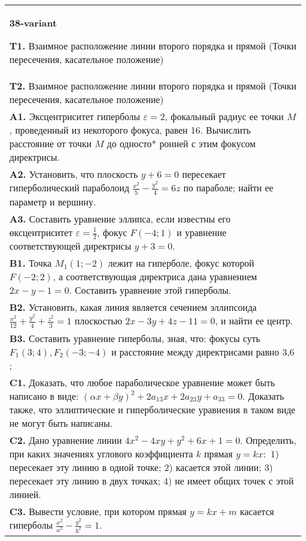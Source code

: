 \documentclass{article}
\begin{document}
\begin{tabular}{m{17cm}}
\textbf{38-variant}
\newline

\textbf{T1.} Взаимное расположение линии второго порядка и прямой (Точки пересечения, касательное положение) \\
\textbf{T2.} Взаимное расположение линии второго порядка и прямой (Точки пересечения, касательное положение) \\
\textbf{A1.} Эксцентриситет гиперболы $\varepsilon=2$, фокальный радиус ее точки $M$, проведенный из некоторого фокуса, равен 16. Вычислить расстояние от точки $M$ до односто* ронней с этим фокусом директрисы. \\
\textbf{A2.} Установить, что плоскость $y+6=0$ пересекает гиперболический параболоид $\frac{x^2}{5}-\frac{y^2}{4}=6 z$ по параболе; найти ее параметр и вершину. \\
\textbf{A3.} Составить уравнение эллипса, если известны его өксцентриситет $\varepsilon=\frac{1}{2}$, фокус $F(-4 ; 1)$ и уравнение соответствующей директрисы $y+3=0$. \\
\textbf{B1.} Точка $M_1(1 ;-2)$ лежит на гиперболе, фокус которой $F(-2 ; 2)$, а соответствующая директриса дана уравнением $2 x-y-1=0$. Составить уравнение этой гиперболы. \\
\textbf{B2.} Установить, какая линия является сечением эллипсоида $\frac{x^2}{12}+\frac{y^2}{4}+\frac{z^2}{3}=1$ плоскостью $2 x-3 y+4 z-11=0$, и найти ее центр. \\
\textbf{B3.} Составить уравнение гиперболы, зная, что: фокусы суть $F_1(3 ; 4), F_2(-3 ;-4)$ и расстояние между директрисами равно 3,6 ; \\
\textbf{C1.} Доказать, что любое параболическое уравнение может быть написано в виде: $ (\alpha x+\beta y) ^2+2a_{13}x+2a_{23}y+a_{33}=0$. Доказать также, что эллиптические и гиперболические уравнения в таком виде не могут быть написаны. \\
\textbf{C2.} Дано уравнение линии $4 x^2-4 x y+y^2+6 x+1=0$. Определить, при каких значениях углового коэффициента $k$ прямая $y=k x:$ 1) пересекает эту линию в одной точке; 2) касается этой линии; 3) пересекает эту линию в двух точках; 4) не имеет общих точек с этой линией. \\
\textbf{C3.} Вывести условие, при котором прямая $y=k x+m$ касается гиперболы $\frac{x^2}{a^2}-\frac{y^2}{b^2}=1$. \\

\end{tabular}
\vspace{1cm}
\end{document}
